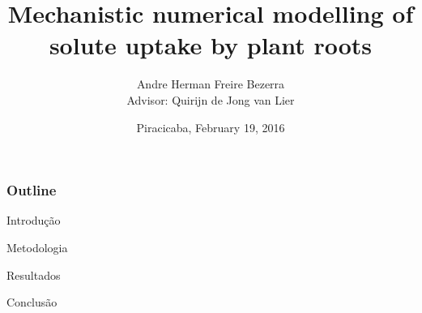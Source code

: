 \documentclass[compress]{beamer}  %
\title{Mechanistic numerical modelling of solute uptake by plant roots}
\author[Bezerra, A.H.F.]
{
Andre Herman Freire Bezerra\\
{\scriptsize Advisor: Quirijn de Jong van Lier}
}
\institute{University of S\~ao Paulo}
\date
{Piracicaba, February 19, 2016}
\begin{document}
\frame{\titlepage}

\begin{frame}
\frametitle{Outline}
Introdução

Metodologia

Resultados

Conclusão
\end{frame}







{\scriptsize 
}
\end{document}
